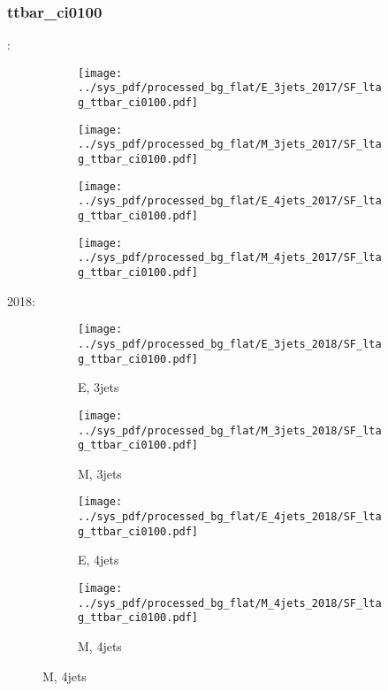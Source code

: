 \documentclass{beamer}
\begin{document}
\begin{frame}
\frametitle{ttbar_ci0100}
\fontsize{5}{1}:
\begin{figure}
\centering
\begin{subfigure}[b]{0.24\textwidth}
\texttt{[image: ../sys\_pdf/processed\_bg\_flat/E\_3jets\_2017/SF\_ltag\_ttbar\_ci0100.pdf]}
\end{subfigure}
\begin{subfigure}[b]{0.24\textwidth}
\texttt{[image: ../sys\_pdf/processed\_bg\_flat/M\_3jets\_2017/SF\_ltag\_ttbar\_ci0100.pdf]}
\end{subfigure}
\begin{subfigure}[b]{0.24\textwidth}
\texttt{[image: ../sys\_pdf/processed\_bg\_flat/E\_4jets\_2017/SF\_ltag\_ttbar\_ci0100.pdf]}
\end{subfigure}
\begin{subfigure}[b]{0.24\textwidth}
\texttt{[image: ../sys\_pdf/processed\_bg\_flat/M\_4jets\_2017/SF\_ltag\_ttbar\_ci0100.pdf]}
\end{subfigure}
\end{figure}
2018:
\begin{figure}
\centering
\begin{subfigure}[b]{0.24\textwidth}
\texttt{[image: ../sys\_pdf/processed\_bg\_flat/E\_3jets\_2018/SF\_ltag\_ttbar\_ci0100.pdf]}
\captionsetup{font=tiny}
\caption{E, 3jets}
\end{subfigure}
\begin{subfigure}[b]{0.24\textwidth}
\texttt{[image: ../sys\_pdf/processed\_bg\_flat/M\_3jets\_2018/SF\_ltag\_ttbar\_ci0100.pdf]}
\captionsetup{font=tiny}
\caption{M, 3jets}
\end{subfigure}
\begin{subfigure}[b]{0.24\textwidth}
\texttt{[image: ../sys\_pdf/processed\_bg\_flat/E\_4jets\_2018/SF\_ltag\_ttbar\_ci0100.pdf]}
\captionsetup{font=tiny}
\caption{E, 4jets}
\end{subfigure}
\begin{subfigure}[b]{0.24\textwidth}
\texttt{[image: ../sys\_pdf/processed\_bg\_flat/M\_4jets\_2018/SF\_ltag\_ttbar\_ci0100.pdf]}
\captionsetup{font=tiny}
\caption{M, 4jets}
\end{subfigure}
\end{figure}
\end{frame}
\end{document}
